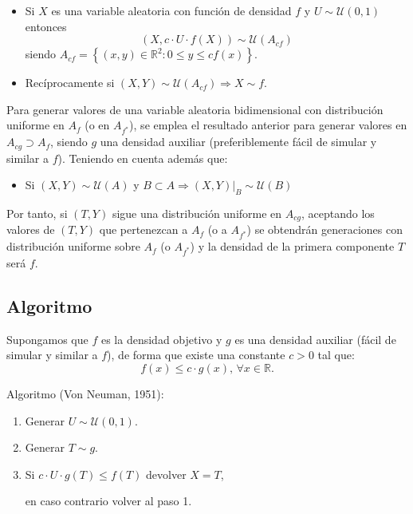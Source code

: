 \documentclass[]{book}
\providecommand{\tightlist}{%
  \setlength{\itemsep}{0pt}\setlength{\parskip}{0pt}}
\theoremstyle{definition}
\theoremstyle{definition}
\theoremstyle{definition}
\theoremstyle{remark}
\begin{document}
\begin{itemize}
\item
  Si \(X\) es una variable aleatoria con función de densidad \(f\) y
  \(U \sim \mathcal{U}\left( 0, 1 \right)\) entonces
  \[\left( X,c\cdot U\cdot f\left( X\right) \right) \sim \mathcal{U}\left(
    A_{cf}\right)\] siendo
  \(A_{cf}=\left\{ \left( x, y \right) \in \mathbb{R}^{2} : 0 \leq y \leq  cf\left( x \right) \right\}\).
\item
  Recíprocamente si
  \(\left( X,Y\right) \sim \mathcal{U}\left(A_{cf}\right) \Rightarrow X\sim f\).
\end{itemize}

Para generar valores de una variable aleatoria bidimensional con
distribución uniforme en \(A_{f}\) (o en \(A_{f^{\ast }}\)), se emplea
el resultado anterior para generar valores en \(A_{cg} \supset A_{f}\),
siendo \(g\) una densidad auxiliar (preferiblemente fácil de simular y
similar a \(f\)). Teniendo en cuenta además que:

\begin{itemize}
\tightlist
\item
  Si \(\left( X,Y\right) \sim \mathcal{U}\left( A\right)\) y
  \(B \subset A\Rightarrow \left. \left( X,Y\right) \right\vert _{B}  \sim \mathcal{U}\left(B\right)\)
\end{itemize}

Por tanto, si \(\left( T, Y \right)\) sigue una distribución uniforme en
\(A_{cg}\), aceptando los valores de \(\left( T, Y\right)\) que
pertenezcan a \(A_{f}\) (o a \(A_{f^{\ast }}\)) se obtendrán
generaciones con distribución uniforme sobre \(A_{f}\) (o
\(A_{f^{\ast }}\)) y la densidad de la primera componente \(T\) será
\(f\).

\subsection{Algoritmo}\label{algoritmo}

Supongamos que \(f\) es la densidad objetivo y \(g\) es una densidad
auxiliar (fácil de simular y similar a \(f\)), de forma que existe una
constante \(c>0\) tal que:
\[f\left( x\right) \leq c\cdot g\left( x\right) 
\text{, }\forall x\in \mathbb{R}\text{.}\]

Algoritmo (Von Neuman, 1951):

\begin{enumerate}
\def\labelenumi{\arabic{enumi}.}
\item
  Generar \(U\sim \mathcal{U}\left( 0, 1\right)\).
\item
  Generar \(T\sim g\).
\item
  Si \(c\cdot U\cdot g\left( T\right) \leq f\left( T\right)\) devolver
  \(X=T\),

  en caso contrario volver al paso 1.
\end{enumerate}
\end{document}

